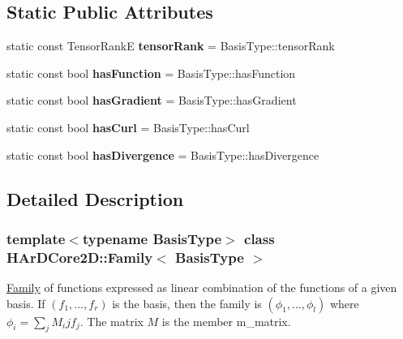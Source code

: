 \subsection*{Static Public Attributes}
\begin{DoxyCompactItemize}
\item 
\mbox{\label{classHArDCore2D_1_1Family_ae7a0bf7e235f447facbea1470237a09e}} 
static const Tensor\+RankE {\bfseries tensor\+Rank} = Basis\+Type\+::tensor\+Rank
\item 
\mbox{\label{classHArDCore2D_1_1Family_adadcc5cd716933a3b1d54794b860bdcc}} 
static const bool {\bfseries has\+Function} = Basis\+Type\+::has\+Function
\item 
\mbox{\label{classHArDCore2D_1_1Family_ae39bd5582b1fa4926b4f6eb2143cb8b7}} 
static const bool {\bfseries has\+Gradient} = Basis\+Type\+::has\+Gradient
\item 
\mbox{\label{classHArDCore2D_1_1Family_aa6193ca9c9f178fe6bfa2f0d85ba86b1}} 
static const bool {\bfseries has\+Curl} = Basis\+Type\+::has\+Curl
\item 
\mbox{\label{classHArDCore2D_1_1Family_a4704c8206eb8a68ec251b10a9f90b54b}} 
static const bool {\bfseries has\+Divergence} = Basis\+Type\+::has\+Divergence
\end{DoxyCompactItemize}


\subsection{Detailed Description}
\subsubsection*{template$<$typename Basis\+Type$>$\newline
class H\+Ar\+D\+Core2\+D\+::\+Family$<$ Basis\+Type $>$}

\hyperlink{classHArDCore2D_1_1Family}{Family} of functions expressed as linear combination of the functions of a given basis. If $(f_1,...,f_r)$ is the basis, then the family is $(\phi_1,...,\phi_l)$ where $\phi_i = \sum_j M_ij f_j$. The matrix $M$ is the member m\+\_\+matrix. 


